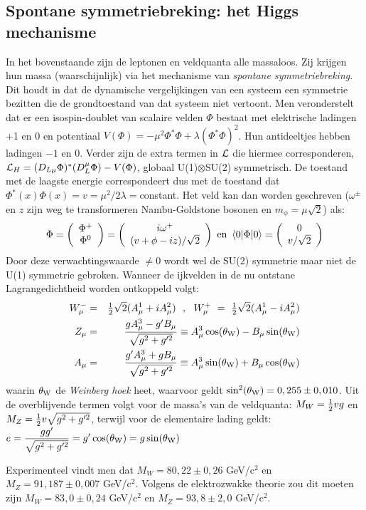\subsection[~~Spontane symmetriebreking: het Higgs mechanisme]{Spontane symmetriebreking: het Higgs mechanisme}
In het bovenstaande zijn de leptonen en veldquanta alle massaloos. Zij
krijgen hun massa (waarschijnlijk) via het mechanisme van {\it spontane
symmetriebreking}. Dit houdt in dat de dynamische vergelijkingen van een
systeem een symmetrie bezitten die de grondtoestand van dat systeem niet
vertoont. Men veronderstelt dat er een isospin-doublet van scalaire velden
$\Phi$ bestaat met elektrische ladingen +1 en 0 en potentiaal
$V(\Phi)=-\mu^2\Phi^*\Phi+\lambda(\Phi^*\Phi)^2$. Hun antideeltjes hebben
ladingen $-1$ en 0. Verder zijn de extra termen in ${\cal L}$ die hiermee
corresponderen, ${\cal L}_H=(D_{L\mu}\Phi)^*(D_L^\mu\Phi)-V(\Phi)$, globaal
U(1)$\otimes$SU(2) symmetrisch. De toestand met de laagste energie
correspondeert dus met de toestand dat $\Phi^*(x)\Phi(x)=v=\mu^2/2\lambda=$constant.
Het veld kan dan worden geschreven ($\omega^\pm$ en $z$ zijn weg te
transformeren Nambu-Goldstone bosonen en $m_\phi=\mu\sqrt{2}$) als:
\[
\Phi=\left(\begin{array}{c}\Phi^+\\ \Phi^0\end{array}\right)=
\left(\begin{array}{c}i\omega^+\\ (v+\phi-iz)/\sqrt{2}\end{array}\right)\mbox{~en~}
\left\langle 0|\Phi|0 \right\rangle=\left(\begin{array}{c}0\\ v/\sqrt{2}\end{array}\right)
\]
Door deze verwachtingswaarde $\neq0$ wordt wel de SU(2) symmetrie maar niet
de U(1) symmetrie gebroken. Wanneer de ijkvelden in de nu ontstane
Lagrangedichtheid worden ontkoppeld volgt:
\begin{eqnarray*}
W_\mu^-&=&\mbox{$\frac{1}{2}$}\sqrt{2}(A_\mu^1+iA_\mu^2)~~,~~W_\mu^+~=~\mbox{$\frac{1}{2}$}\sqrt{2}(A_\mu^1-iA_\mu^2)\\
Z_\mu&=&\frac{gA_\mu^3-g'B_\mu}{\sqrt{g^2+g'^2}}\equiv A_\mu^3\cos(\theta_{\rm W})-B_\mu\sin(\theta_{\rm W})\\
A_\mu&=&\frac{g'A_\mu^3+gB_\mu}{\sqrt{g^2+g'^2}}\equiv A_\mu^3\sin(\theta_{\rm W})+B_\mu\cos(\theta_{\rm W})
\end{eqnarray*}
waarin $\theta_{\rm W}$ de {\it Weinberg hoek} heet, waarvoor geldt
$\sin^2(\theta_{\rm W})=0,255\pm0,010$. Uit de overblijvende termen volgt
voor de massa's van de veldquanta: $M_W=\mbox{$\frac{1}{2}$} vg$ en
$M_Z=\mbox{$\frac{1}{2}$} v\sqrt{g^2+g'^2}$, terwijl voor de elementaire lading geldt:
$\displaystyle e=\frac{gg'}{\sqrt{g^2+g'^2}}=g'\cos(\theta_{\rm W})=g\sin(\theta_{\rm W})$
\par
Experimenteel vindt men dat $M_W=80,22\pm0,26$ GeV/c$^2$ en $M_Z=91,187\pm0,007$
GeV/c$^2$. Volgens de elektrozwakke theorie zou dit moeten zijn
$M_W=83,0\pm0,24$ GeV/c$^2$ en $M_Z=93,8\pm2,0$ GeV/c$^2$.

